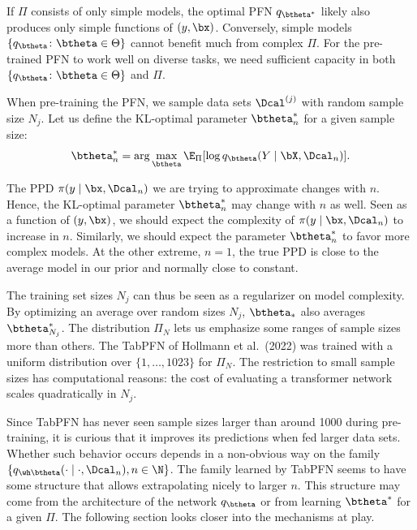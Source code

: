 \documentclass[aspectratio=169,10pt]{beamer}
\newcommand{\currentheading}{\ifx\insertsubsection\empty\insertsection\else\insertsubsection\fi}
\begin{document}
\begin{frame}{\currentheading}
If $\Pi$ consists of only simple models, the optimal PFN $q_{\btheta^*}$ likely also produces only simple functions of $(y, \bx)$. Conversely, simple models $\{q_{\btheta}\colon \btheta \in \Theta\}$ cannot benefit much from complex $\Pi$. For the pre-trained PFN to work well on diverse tasks, we need sufficient capacity in both $\{q_{\btheta}\colon \btheta \in \Theta\}$ and $\Pi$.
\end{frame}

\begin{frame}{\currentheading}
When pre-training the PFN, we sample data sets $\Dcal^{(j)}$ with random sample size $N_j$. Let us define the KL-optimal parameter $\btheta^*_n$ for a given sample size:
\begin{align*}
	\btheta^*_{n} = \arg\max_{\btheta} \E_{\Pi} [\log q_{\btheta}(Y \mid \bX, \Dcal_{n})].
\end{align*}
\end{frame}

\begin{frame}{\currentheading}
The PPD $\pi(y \mid \bx, \Dcal_{n})$ we are trying to approximate changes with $n$. Hence, the KL-optimal parameter $\btheta^*_{n}$ may change with $n$ as well. Seen as a function of $(y, \bx)$, we should expect the complexity of $\pi(y \mid \bx, \Dcal_n)$ to increase in $n$. Similarly, we should expect the parameter $\btheta^*_{n}$ to favor more complex models. At the other extreme, $n = 1$, the true PPD is close to the average model in our prior and normally close to constant.

The training set sizes $N_j$ can thus be seen as a regularizer on model complexity. By optimizing an average over random sizes $N_j$, $\btheta_*$ also averages $\btheta^*_{N_j}$. The distribution $\Pi_N$ lets us emphasize some ranges of sample sizes more than others. The TabPFN of Hollmann et al.\ (2022) was trained with a uniform distribution over $\{1, \dots, 1023\}$ for $\Pi_N$. The restriction to small sample sizes has computational reasons: the cost of evaluating a transformer network scales quadratically in $N_j$.
\end{frame}

\begin{frame}{\currentheading}
Since TabPFN has never seen sample sizes larger than around 1000 during pre-training, it is curious that it improves its predictions when fed larger data sets. Whether such behavior occurs depends in a non-obvious way on the family $\{q_{\wh \btheta}(\cdot \mid \cdot, \Dcal_n), n \in \N\}$. The family learned by TabPFN seems to have some structure that allows extrapolating nicely to larger $n$. This structure may come from the architecture of the network $q_{\btheta}$ or from learning $\btheta^*$ for a given $\Pi$. The following section looks closer into the mechanisms at play.
\end{frame}
\end{document}
